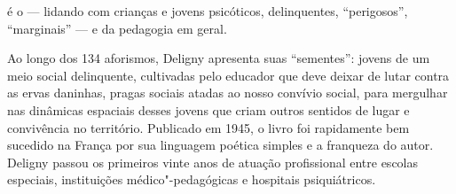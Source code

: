 \hspace*{-7cm}\hrulefill\hspace*{-7cm}

\medskip

 é o  --- lidando com crianças e jovens psicóticos, delinquentes, “perigosos”, “marginais” --- e da pedagogia em geral.

Ao longo dos 134 aforismos, Deligny apresenta suas “sementes”: jovens de um meio social delinquente, cultivadas pelo educador que deve deixar de lutar contra as ervas daninhas, pragas sociais atadas ao nosso convívio social, para mergulhar nas dinâmicas espaciais desses jovens que criam outros sentidos de lugar e convivência no território. Publicado em 1945, o livro foi rapidamente bem sucedido na França por sua linguagem poética simples e a franqueza do autor. Deligny passou os primeiros vinte anos de atuação profissional entre escolas especiais, instituições médico"-pedagógicas e hospitais psiquiátricos.

\vfill

\hspace*{-.4cm}\begin{minipage}[c]{1\linewidth}
\small{
{}}
\end{minipage}


\pagebreak
\pagestyle{n-1cat}

